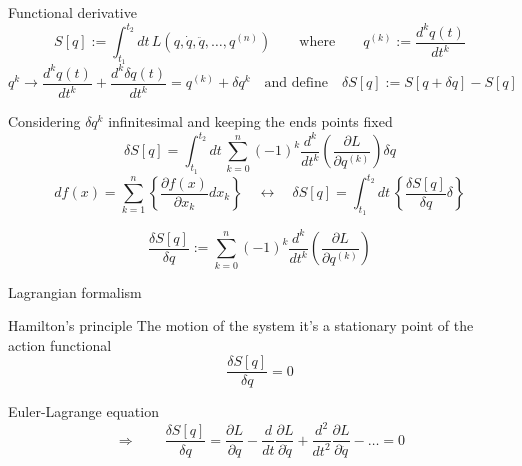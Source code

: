 \documentclass[10pt]{beamer}
\begin{document}
  \begin{frame}{Functional derivative}
    \begin{equation*}
      S[q] := \int_{t_1}^{t_2} dt \,
      L \left(q, \dot{q}, \ddot{q}, \ldots, q^{(n)} \right)
      \qquad \text{where} \qquad q^{(k)} := \frac{d^k q(t)}{dt^k}
    \end{equation*}
    \begin{equation*}
      q^{k} \rightarrow \frac{d^k q(t)}{dt^k} + \frac{d^k \delta q(t)}{dt^k} =
      q^{(k)} + \delta q^{k}
      \quad \text{and define} \quad
      \delta S[q] := S[q + \delta q] - S[q]
    \end{equation*}\vspace{0.2em}

    Considering $\delta q^{k}$ infinitesimal and keeping the ends points fixed
    \begin{equation*}
      \delta S[q] = \int_{t_1}^{t_2} dt \,
      \sum_{k=0}^{n} {(-1)}^k \frac{d^k}{dt^k}
      \left(\frac{\partial L}{\partial q^{(k)}}\right) \delta q
    \end{equation*}
    \begin{equation*}
      df(x) = \sum_{k=1}^{n}
      \left\{\frac{\partial f(x)}{\partial x_k} dx_k\right\}
      \quad \longleftrightarrow \quad
      \delta S[q] = \int_{t_1}^{t_2} dt \,
      \left\{ \frac{\delta S[q]}{\delta q} \delta \right\}
    \end{equation*}

    \alert{
    \begin{equation*}
      \frac{\delta S[q]}{\delta q}:=
      \sum_{k=0}^{n} {(-1)}^k \frac{d^k}{dt^k}
      \left(\frac{\partial L}{\partial q^{(k)}}\right)
    \end{equation*}
    }
  \end{frame}

  \begin{frame}{Lagrangian formalism}
    \begin{alertblock}{Hamilton's principle}
      \vspace{0.5em}
      The motion of the system it's a stationary point of the action functional
      \begin{equation*}
        \frac{\delta S[q]}{\delta q} = 0
      \end{equation*}
    \end{alertblock}
    \begin{alertblock}{Euler-Lagrange equation}
      \vspace{0.5em}
      \begin{equation*}
        \Rightarrow \qquad
        \frac{\delta S[q]}{\delta q} =
        \frac{\partial L}{\partial q} -
        \frac{d}{dt}\frac{\partial L}{\partial \dot{q}} +
        \frac{d^2}{dt^2}\frac{\partial L}{\partial \ddot{q}} -
        \ldots = 0
      \end{equation*}
    \end{alertblock}
  \end{frame}
\end{document}
